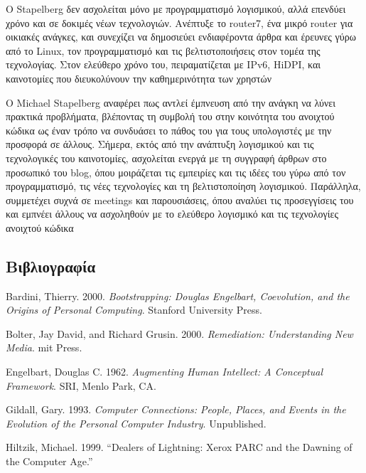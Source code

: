 \documentclass[
]{article}
\newlength{\cslhangindent}
\newlength{\cslentryspacingunit} %
\newenvironment{CSLReferences}[2] %
 {%
  \setlength{\parindent}{0pt}
  \ifodd #1
  \let\oldpar\par
  \def\par{\hangindent=\cslhangindent\oldpar}
  \fi
  \setlength{\parskip}{#2\cslentryspacingunit}
 }%
 {}
\begin{document}
Ο Stapelberg δεν ασχολείται μόνο με προγραμματισμό λογισμικού, αλλά
επενδύει χρόνο και σε δοκιμές νέων τεχνολογιών. Ανέπτυξε το router7, ένα
μικρό router για οικιακές ανάγκες, και συνεχίζει να δημοσιεύει
ενδιαφέροντα άρθρα και έρευνες γύρω από το Linux, τον προγραμματισμό και
τις βελτιστοποιήσεις στον τομέα της τεχνολογίας. Στον ελεύθερο χρόνο
του, πειραματίζεται με IPv6, HiDPI, και καινοτομίες που διευκολύνουν την
καθημερινότητα των χρηστών

Ο Michael Stapelberg αναφέρει πως αντλεί έμπνευση από την ανάγκη να
λύνει πρακτικά προβλήματα, βλέποντας τη συμβολή του στην κοινότητα του
ανοιχτού κώδικα ως έναν τρόπο να συνδυάσει το πάθος του για τους
υπολογιστές με την προσφορά σε άλλους. Σήμερα, εκτός από την ανάπτυξη
λογισμικού και τις τεχνολογικές του καινοτομίες, ασχολείται ενεργά με τη
συγγραφή άρθρων στο προσωπικό του blog, όπου μοιράζεται τις εμπειρίες
και τις ιδέες του γύρω από τον προγραμματισμό, τις νέες τεχνολογίες και
τη βελτιστοποίηση λογισμικού. Παράλληλα, συμμετέχει συχνά σε meetings
και παρουσιάσεις, όπου αναλύει τις προσεγγίσεις του και εμπνέει άλλους
να ασχοληθούν με το ελεύθερο λογισμικό και τις τεχνολογίες ανοιχτού
κώδικα

\hypertarget{ux3b2ux3b9ux3b2ux3bbux3b9ux3bfux3b3ux3c1ux3b1ux3c6ux3afux3b1}{%
\subsection*{Βιβλιογραφία}\label{ux3b2ux3b9ux3b2ux3bbux3b9ux3bfux3b3ux3c1ux3b1ux3c6ux3afux3b1}}

\hypertarget{refs}{}
\begin{CSLReferences}{0}{0}
\end{CSLReferences}

Bardini, Thierry. 2000. \emph{Bootstrapping: Douglas Engelbart,
Coevolution, and the Origins of Personal Computing}. Stanford University
Press.

Bolter, Jay David, and Richard Grusin. 2000. \emph{Remediation:
Understanding New Media}. mit Press.

Engelbart, Douglas C. 1962. \emph{Augmenting Human Intellect: A
Conceptual Framework}. SRI, Menlo Park, CA.

Gildall, Gary. 1993. \emph{Computer Connections: People, Places, and
Events in the Evolution of the Personal Computer Industry}. Unpublished.

Hiltzik, Michael. 1999. {``Dealers of Lightning: Xerox PARC and the
Dawning of the Computer Age.''}
\end{document}
